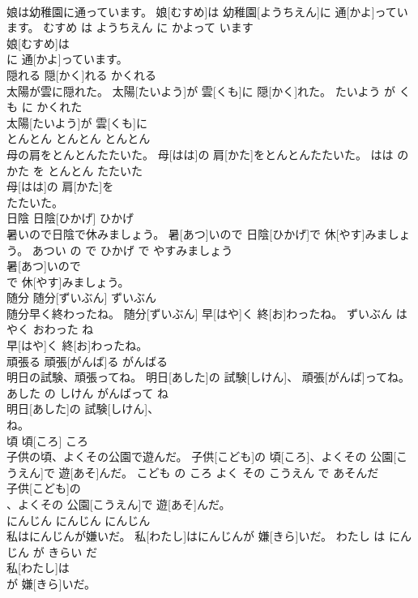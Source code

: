 \documentclass[8pt]{extreport}
\begin{document}
\begin{CJK}{UTF8}{min}
\\	娘は幼稚園に通っています。	娘[むすめ]は 幼稚園[ようちえん]に 通[かよ]っています。	むすめ は ようちえん に かよって います	
\\	娘[むすめ]は
\\	に 通[かよ]っています。			
\\	隠れる	隠[かく]れる	かくれる	
\\	太陽が雲に隠れた。	太陽[たいよう]が 雲[くも]に 隠[かく]れた。	たいよう が くも に かくれた	
\\	太陽[たいよう]が 雲[くも]に
\\	とんとん	とんとん	とんとん	
\\	母の肩をとんとんたたいた。	母[はは]の 肩[かた]をとんとんたたいた。	はは の かた を とんとん たたいた	
\\	母[はは]の 肩[かた]を
\\	たたいた。			
\\	日陰	日陰[ひかげ]	ひかげ	
\\	暑いので日陰で休みましょう。	暑[あつ]いので 日陰[ひかげ]で 休[やす]みましょう。	あつい の で ひかげ で やすみましょう	
\\	暑[あつ]いので
\\	で 休[やす]みましょう。			
\\	随分	随分[ずいぶん]	ずいぶん	
\\	随分早く終わったね。	随分[ずいぶん] 早[はや]く 終[お]わったね。	ずいぶん はやく おわった ね	
\\	早[はや]く 終[お]わったね。			
\\	頑張る	頑張[がんば]る	がんばる	
\\	明日の試験、頑張ってね。	明日[あした]の 試験[しけん]、 頑張[がんば]ってね。	あした の しけん がんばって ね	
\\	明日[あした]の 試験[しけん]、
\\	ね。			
\\	頃	頃[ころ]	ころ	
\\	子供の頃、よくその公園で遊んだ。	子供[こども]の 頃[ころ]、よくその 公園[こうえん]で 遊[あそ]んだ。	こども の ころ よく その こうえん で あそんだ	
\\	子供[こども]の
\\	、よくその 公園[こうえん]で 遊[あそ]んだ。			
\\	にんじん	にんじん	にんじん	
\\	私はにんじんが嫌いだ。	私[わたし]はにんじんが 嫌[きら]いだ。	わたし は にんじん が きらい だ	
\\	私[わたし]は
\\	が 嫌[きら]いだ。			

\end{CJK}
\end{document}
